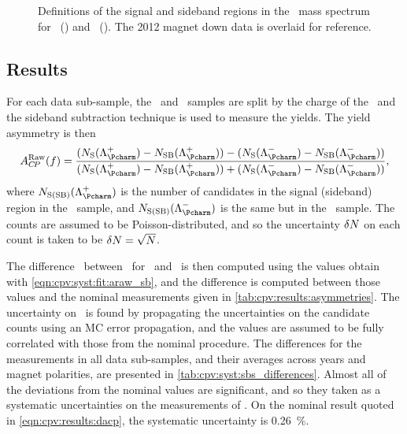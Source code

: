 \begin{figure}
\begin{subfigure}[b]{0.5\textwidth}
    \caption{\ppipi}
    \label{fig:cpv:syst:mass_windows:ppipi}
  \end{subfigure}
  \caption{%
    Definitions of the signal and sideband regions in the \PLambdac\ mass 
    spectrum for \pKK~() and 
    \ppipi~().
    The 2012 magnet down data is overlaid for reference.
  }
  \label{fig:cpv:syst:mass_windows}
\end{figure}

\subsection{Results}
\label{chap:cpv:syst:fit:results}

For each data sub-sample, the \pKK\ and \ppipi\ samples are split by the charge 
of the \PLambdac\ and the sideband subtraction technique is used to measure the 
yields.
The yield asymmetry is then
\begin{equation}
  \ARaw(f) = \frac{%
    (N_{\text{S}}(\PLambdac) - N_{\text{SB}}(\PLambdac)) -
    (N_{\text{S}}(\APLambdac) - N_{\text{SB}}(\APLambdac))
  }{%
    (N_{\text{S}}(\PLambdac) - N_{\text{SB}}(\PLambdac)) +
    (N_{\text{S}}(\APLambdac) - N_{\text{SB}}(\APLambdac))
  },
  \label{eqn:cpv:syst:fit:araw_sb}
\end{equation}
where $N_{\text{S(SB)}}(\PLambdac)$ is the number of candidates in the signal 
(sideband) region in the \PLambdac\ sample, and $N_{\text{S(SB)}}(\APLambdac)$ 
is the same but in the \APLambdac\ sample.
The counts are assumed to be Poisson-distributed, and so the uncertainty 
$\delta{N}$ on each count is taken to be $\delta{N} = \sqrt{N}$.

The difference \dACP\ between \ARaw\ for \pKK\ and \ppipi\ is then computed 
using the values obtain with \cref{eqn:cpv:syst:fit:araw_sb}, and the 
difference is computed between those values and the nominal measurements given 
in \cref{tab:cpv:results:asymmetries}.
The uncertainty on \ARaw\ is found by propagating the uncertainties on the 
candidate counts using an \ac{MC} error propagation, and the values are assumed 
to be fully correlated with those from the nominal procedure.
The differences for the measurements in all data sub-samples, and their 
averages across years and magnet polarities, are presented in 
\cref{tab:cpv:syst:sbs_differences}.
Almost all of the deviations from the nominal values are significant, and so 
they taken as a systematic uncertainties on the measurements of \dACP\@.
On the nominal result quoted in \cref{eqn:cpv:results:dacp}, the systematic 
uncertainty is \SI{0.26}{\percent}.

